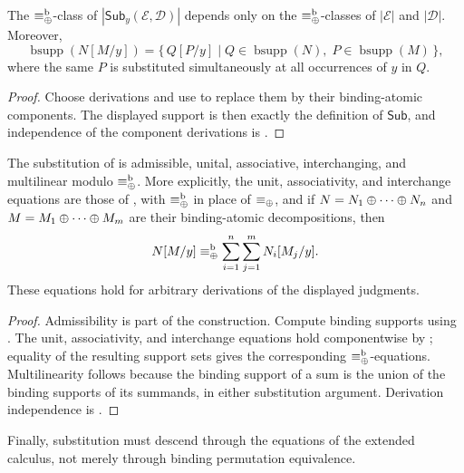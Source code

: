 \begin{corollary}
\label{prop:letrec_subst_derivation_independence}
The $\equiv_{\mathbin{\oplus}}^{\mathrm b}$-class of
$|\mathsf{Sub}_y(\mathcal E,\mathcal D)|$ depends only on the
$\equiv_{\mathbin{\oplus}}^{\mathrm b}$-classes of $|\mathcal E|$ and $|\mathcal D|$.
Moreover,
\[
\operatorname{bsupp}(N[M/y])
=
\{\,Q[P/y]\mid Q\in\operatorname{bsupp}(N),\;
                    P\in\operatorname{bsupp}(M)\,\},
\]
where the same $P$ is substituted simultaneously at all occurrences of $y$
in $Q$.
\end{corollary}
\begin{proof}
Choose derivations and use  to replace them by
their binding-atomic components.  The displayed support is then exactly the
definition of $\mathsf{Sub}$, and independence of the component derivations is
.
\end{proof}

\begin{theorem}
\label{theorem:letrec_subst_properties}
The substitution of  is admissible, unital,
associative, interchanging, and multilinear modulo
$\equiv_{\mathbin{\oplus}}^{\mathrm b}$.  More explicitly, the unit, associativity, and
interchange equations are those of , with
$\equiv_{\mathbin{\oplus}}^{\mathrm b}$ in place of $\equiv_{\mathbin{\oplus}}$, and if
$N=N_1\mathbin{\oplus} \cdots\mathbin{\oplus} N_n$ and $M=M_1\mathbin{\oplus} \cdots\mathbin{\oplus} M_m$ are their binding-atomic
decompositions, then
\[
N[M/y]
\equiv_{\mathbin{\oplus}}^{\mathrm b}
\sum_{i=1}^{n}\sum_{j=1}^{m}N_i[M_j/y].
\]
These equations hold for arbitrary derivations of the displayed judgments.
\end{theorem}
\begin{proof}
Admissibility is part of the construction.  Compute binding supports using
.  The unit, associativity,
and interchange equations hold componentwise by
; equality of the resulting support
sets gives the corresponding $\equiv_{\mathbin{\oplus}}^{\mathrm b}$-equations.
Multilinearity follows because the binding support of a sum is the union of
the binding supports of its summands, in either substitution argument.
Derivation independence is
.
\end{proof}

Finally, substitution must descend through the equations of the extended
calculus, not merely through binding permutation equivalence.

